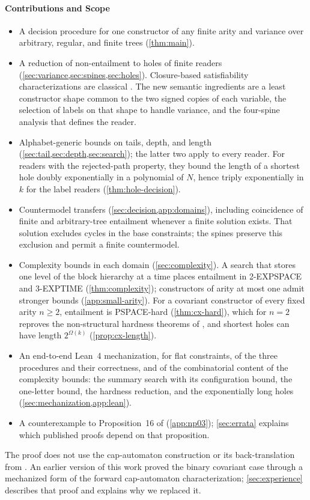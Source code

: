 \paragraph{Contributions and Scope}
\begin{itemize}[leftmargin=*]
\item A decision procedure for one constructor of any finite arity and
  variance over arbitrary, regular, and finite trees (\cref{thm:main}).
\item A reduction of non-entailment to holes of finite readers
  (\cref{sec:variance,sec:spines,sec:holes}). Closure-based satisfiability
  characterizations are classical
  \citep{KozenPalsbergSchwartzbach94,PalsbergOKeefe95,PalsbergWandOKeefe97}.
  The new semantic ingredients are a least constructor shape common to the
  two signed copies of each variable, the selection of labels on that shape
  to handle variance, and the four-spine analysis that defines the reader.
\item Alphabet-generic bounds on tails, depth, and length
  (\cref{sec:tail,sec:depth,sec:search}); the latter two apply to every
  reader. For readers with the rejected-path property, they bound the
  length of a shortest hole doubly exponentially in a polynomial of $N$,
  hence triply exponentially in $k$ for the label readers
  (\cref{thm:hole-decision}).
\item Countermodel transfers (\cref{sec:decision,app:domains}), including
  coincidence of finite and arbitrary-tree entailment whenever a finite
  solution exists. That solution excludes cycles in the base constraints;
  the spines preserve this exclusion and permit a finite countermodel.
\item Complexity bounds in each domain (\cref{sec:complexity}). A search
  that stores one level of the block hierarchy at a time places entailment in
  2-EXPSPACE and 3-EXPTIME (\cref{thm:complexity}); constructors of arity at
  most one admit stronger bounds (\cref{app:small-arity}). For a covariant
  constructor of every fixed arity
  $n\ge2$, entailment is PSPACE-hard (\cref{thm:cx-hard}), which for $n=2$
  reproves the non-structural hardness theorems of \citet{HengleinRehof98},
  and shortest holes can have length $2^{\Omega(k)}$ (\cref{prop:cx-length}).
\item An end-to-end Lean~4 mechanization, for flat constraints, of the three
  procedures and their correctness, and of the combinatorial content of the
  complexity bounds: the summary search with its configuration bound, the
  one-letter bound, the hardness reduction, and the exponentially long holes
  (\cref{sec:mechanization,app:lean}).
\item A counterexample to Proposition~16 of \citet{NiehrenPriesnitz03}
  (\cref{app:np03}); \cref{sec:errata} explains which published proofs
  depend on that proposition.
\end{itemize}
The proof does not use the cap-automaton construction or its
back-translation from \citet{NiehrenPriesnitz03}. An earlier version of this
work proved the binary covariant case through a mechanized form of the
forward cap-automaton characterization; \cref{sec:experience} describes that
proof and explains why we replaced it.

